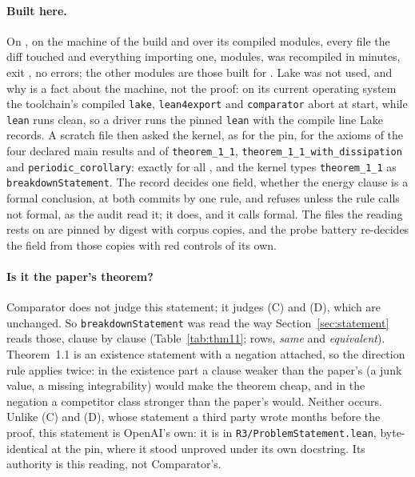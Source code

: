 \documentclass[11pt]{article}
\newcommand{\lean}[1]{\texttt{#1}}
\begin{document}
\paragraph{Built here.} {\sloppy On \UpBuildDate{}, on the machine of the \BuildDate{} build
and over its compiled modules, every file the diff touched and everything importing one,
\UpBuilt{} modules, was recompiled in \UpBuildMinutes{} minutes, exit \UpBuildExit, no
errors; the other \UpReused{} modules are those built for \lean{\LeanCommit}. Lake was not
used, and why is a fact about the machine, not the proof: on its current operating system the
toolchain's compiled \lean{lake}, \lean{lean4export} and \lean{comparator} abort at start,
while \lean{lean} runs clean, so a driver runs the pinned \lean{lean} with the compile line
Lake records. A scratch file then asked the kernel, as for the pin, for the axioms of the four
declared main results and of \lean{theorem\_1\_1}, \lean{theorem\_1\_1\_with\_dissipation} and
\lean{periodic\_corollary}: exactly \AxiomList{} for all \UpAxiomDecls, and the kernel types
\lean{theorem\_1\_1} as \lean{breakdownStatement}. The record decides one field, whether the
energy clause is a formal conclusion, at both commits by one rule, and refuses unless the rule
calls \lean{\LeanCommit} not formal, as the audit read it; it does, and it calls
\lean{\UpCommit} formal. The \UpPinnedFiles{} files the reading rests on are pinned by digest
with corpus copies, and the probe battery re-decides the field from those copies with
\UpBatteryReds{} red controls of its own.\par}

\paragraph{Is it the paper's theorem?} Comparator does not judge this statement; it judges
(C) and (D), which are unchanged. So \lean{breakdownStatement} was read the way
Section~\ref{sec:statement} reads those, clause by clause (Table~\ref{tab:thm11};
\UpFidRows{} rows, \UpFidSame{} \emph{same} and \UpFidEquivalent{} \emph{equivalent}).
Theorem~1.1 is an existence statement with a negation attached, so the direction rule applies
twice: in the existence part a clause weaker than the paper's (a junk value, a missing
integrability) would make the theorem cheap, and in the negation a competitor class stronger
than the paper's would. Neither occurs. Unlike (C) and (D), whose statement a third party
wrote months before the proof, this statement is OpenAI's own: it is in
\lean{R3/ProblemStatement.lean}, byte-identical at the pin, where it stood unproved under its
own docstring. Its authority is this reading, not Comparator's.
\end{document}
